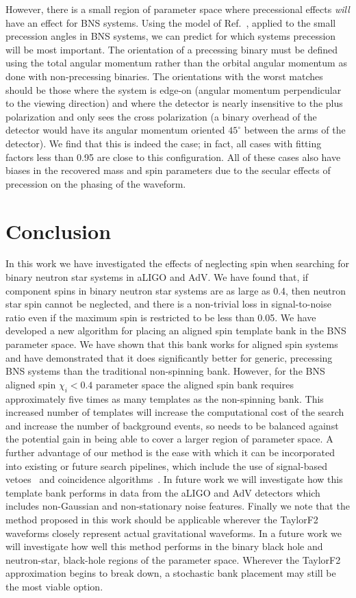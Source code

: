However, there is a small region of parameter space where precessional effects \textit{will}
have an effect for BNS systems.
Using the model of Ref.~\cite{Brown:2012gs}, applied to the small precession angles in BNS systems, 
we can predict for which systems precession will be most important.
The orientation of a precessing binary must be defined using the total angular momentum rather than the 
orbital angular momentum as done with non-precessing binaries. 
The orientations with the worst matches should be those where the system is edge-on 
(angular momentum perpendicular to the viewing direction) and where the detector is nearly insensitive 
to the plus polarization and only sees the cross polarization (a binary overhead of the detector would have 
its angular momentum oriented $45^{\circ}$ between the arms of the detector).
We find that
this is indeed the case; in fact, all cases with fitting factors less than 0.95 are close to
this configuration. All of these cases also have biases in the recovered mass and
spin parameters due to the secular effects of precession on the phasing of the waveform.

\section{Conclusion}
\label{sec:conclusion}

In this work we have investigated the effects of neglecting spin when
searching for binary neutron star systems in aLIGO and AdV. We have found
that, if component spins in binary neutron star systems are as large as 0.4,
then neutron star spin cannot be neglected, and there is a non-trivial loss in
signal-to-noise ratio even if the maximum spin is restricted to be less than
0.05.  We have developed a new algorithm for placing an aligned spin template
bank in the BNS parameter space.  We have shown that this bank works for
aligned spin systems and have demonstrated that it does significantly better
for generic, precessing BNS systems than the traditional non-spinning bank.
However, for the BNS aligned spin $\chi_i < 0.4$ parameter space the aligned
spin bank requires approximately five times as many templates as the
non-spinning bank. This increased number of templates will increase the
computational cost of the search and increase the number of background events,
so needs to be balanced against the potential gain in being able to cover a
larger region of parameter space. A further advantage of our method is the ease
with which it can be incorporated into existing or future search
pipelines, which include the use of signal-based vetoes~\cite{Allen:2004gu}
and coincidence algorithms~\cite{Robinson:2008}. In future work we will
investigate how this template bank performs in data from the aLIGO and AdV
detectors which includes non-Gaussian and non-stationary noise features.
Finally we note that the method proposed in this work should be applicable
wherever the TaylorF2 waveforms closely represent actual gravitational
waveforms. In a future work we will investigate how well this method performs
in the binary black hole and neutron-star, black-hole regions of the parameter space.
Wherever the TaylorF2 approximation begins to break down, a stochastic
bank placement may still be the most viable option.


